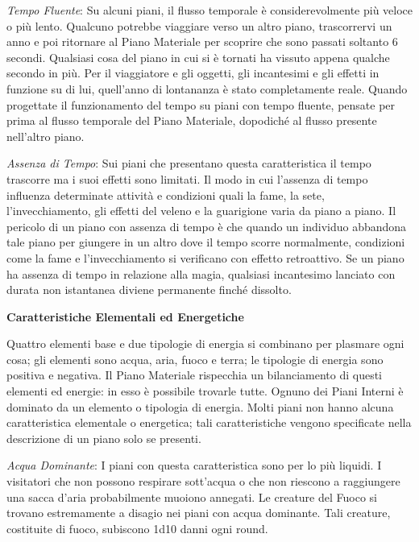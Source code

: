 \documentclass[a4paper,twoside,openany]{book}
\begin{document}
\begin{multicols}{2}
\emph{Tempo Fluente}: Su alcuni piani, il flusso temporale è considerevolmente più veloce o più lento. Qualcuno potrebbe viaggiare verso un altro piano, trascorrervi un anno e poi ritornare al Piano Materiale per scoprire che sono passati soltanto 6 secondi. Qualsiasi cosa del piano in cui si è tornati ha vissuto appena qualche secondo in più. Per il viaggiatore e gli oggetti, gli incantesimi e gli effetti in funzione su di lui, quell'anno di lontananza è stato completamente reale. Quando progettate il funzionamento del tempo su piani con tempo fluente, pensate per prima al flusso temporale del Piano Materiale, dopodiché al flusso presente nell'altro piano.


\emph{Assenza di Tempo}: Sui piani che presentano questa caratteristica il tempo trascorre ma i suoi effetti sono limitati. Il modo in cui l'assenza di tempo influenza determinate attività e condizioni quali la fame, la sete, l'invecchiamento, gli effetti del veleno e la guarigione varia da piano a piano. Il pericolo di un piano con assenza di tempo è che quando un individuo abbandona tale piano per giungere in un altro dove il tempo scorre normalmente, condizioni come la fame e l'invecchiamento si verificano con effetto retroattivo. Se un piano ha assenza di tempo in relazione alla magia, qualsiasi incantesimo lanciato con durata non istantanea diviene permanente finché dissolto.

\medskip

\textbf{Caratteristiche Elementali ed Energetiche}

\medskip

Quattro elementi base e due tipologie di energia si combinano per plasmare ogni cosa; gli elementi sono acqua, aria, fuoco e terra; le tipologie di energia sono positiva e negativa. Il Piano Materiale rispecchia un bilanciamento di questi elementi ed energie: in esso è possibile trovarle tutte. Ognuno dei Piani Interni è dominato da un elemento o tipologia di energia. Molti piani non hanno alcuna caratteristica elementale o energetica; tali caratteristiche vengono specificate nella descrizione di un piano solo se presenti.

\emph{Acqua Dominante}: I piani con questa caratteristica sono per lo più liquidi. I visitatori che non possono respirare sott'acqua o che non riescono a raggiungere una sacca d'aria probabilmente muoiono annegati. Le creature del Fuoco si trovano estremamente a disagio nei piani con acqua dominante. Tali creature, costituite di fuoco, subiscono 1d10 danni ogni round.


\end{multicols}
\end{document}
